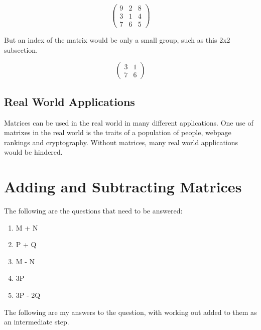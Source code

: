 \documentclass[a4paper,12pt]{article}
\begin{document}
    \begin{equation}
      \begin{pmatrix}
        9 & 2 & 8\\
        3 & 1 & 4\\
        7 & 6 & 5
      \end{pmatrix}
    \end{equation}

    But an index of the matrix would be only a small group, such as this 2x2 subsection.

    \begin{equation}
      \begin{pmatrix}
        3 & 1\\
        7 & 6
      \end{pmatrix}
    \end{equation}

    \subsection{Real World Applications}
      Matrices can be used in the real world in many different applications. One use of matrixes in the real world is the traits of a population of people, webpage rankings and cryptography. Without matrices, many real world applications would be hindered.

  \newpage

  \section{Adding and Subtracting Matrices}
    The following are the questions that need to be answered:
    \begin{enumerate}
      \item M + N
      \item P + Q
      \item M - N
      \item 3P
      \item 3P - 2Q
    \end{enumerate}
    The following are my answers to the question, with working out added to them as an intermediate step.
\end{document}
